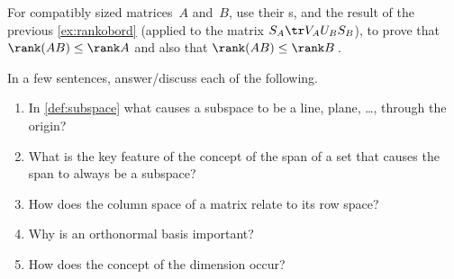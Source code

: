\begin{exercise}  
For compatibly sized matrices~\(A\) and~\(B\), use their \svd{}s, and the result of the previous \cref{ex:rankobord} (applied to the matrix \(S_A\tr V_AU_BS_B\)), to prove that \(\rank(AB)\leq\rank A\) and also that \(\rank(AB)\leq\rank B\)\,.
\end{exercise}




\begin{exercise}  
In a few sentences, answer\slash discuss each of the following.
\begin{enumerate}
\item In \cref{def:subspace} what causes a subspace to be a line, plane, \ldots, through the origin?

\item What is the key feature of the concept of the span of a set that causes the span to always be a subspace?

\item How does the column space of a matrix relate to its row space?

\item Why is an orthonormal basis important?

\item How does the concept of the dimension occur?

\end{enumerate}
\end{exercise}

\begin{comment}%
why, what caused X?
how did X occur?
what-if? what-if-not?
how does X compare with Y?
what is the evidence for X?
why is X important?
\end{comment}







